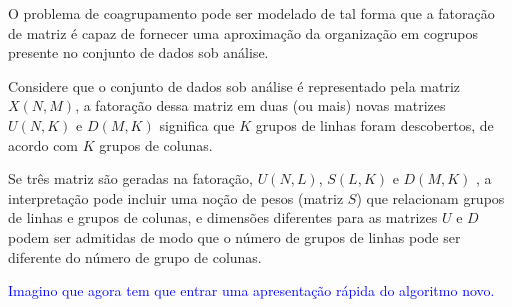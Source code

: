\documentclass[
    12pt,                %
    oneside,            %
    a4paper,            %
    english,            %
    brazil                %
    ]{abntex2ppgsi}
\begin{document}

O problema de coagrupamento pode ser modelado de tal forma que a fatoração de matriz é capaz de fornecer uma aproximação da organização em cogrupos presente no conjunto de dados sob análise.

Considere que o conjunto de dados sob análise é representado pela matriz $X(N,M)$, a fatoração dessa matriz em duas (ou mais) novas matrizes $U(N,K)$ e $D(M,K)$ significa que $K$ grupos de linhas foram descobertos, de acordo com $K$ grupos de colunas.


Se três matriz são geradas na fatoração, $U(N,L)$, $S(L,K)$ e $D(M,K)$ , a interpretação pode incluir uma noção de pesos (matriz $S$) que relacionam grupos de linhas e grupos de colunas, e dimensões diferentes para as matrizes $U$ e $D$ podem ser admitidas de modo que o número de grupos de linhas pode ser diferente do número de grupo de colunas.


\textcolor{blue}{Imagino que agora tem que entrar uma apresentação rápida do algoritmo novo.}




\end{document}
